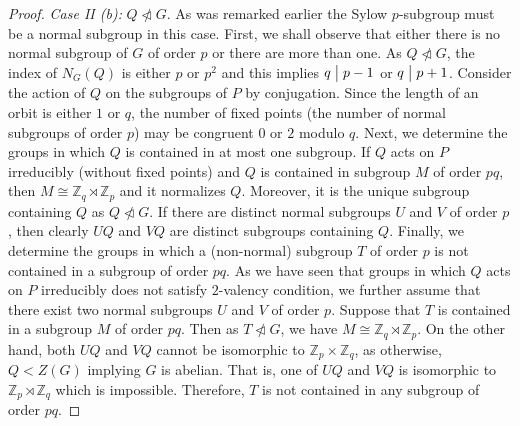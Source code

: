 \documentclass[a4paper,12pt]{article}
\theoremstyle{definition}
\theoremstyle{remark}
\theoremstyle{theorem}
\newcommand{\divides}{\bigm|}
\begin{document}
\begin{proof}
  \emph{Case II (b):} $Q\ntriangleleft G$. As was remarked earlier the Sylow $p$-subgroup must be a normal subgroup in this case. First, we shall observe
  that either there is no normal subgroup of $G$ of order $p$ or there
  are more than one. As $Q\ntriangleleft G$, the index of
  $N_G(Q)$ is either $p$ or $p^2$ and this implies
  $q\divides  p-1$ or $q\divides p+1$. Consider the action of $Q$ on the
  subgroups of $P$ by conjugation. Since the length of an orbit is
  either $1$ or $q$, the number of fixed points (the number of normal
  subgroups of order $p$) may be congruent $0$ or $2$ modulo $q$. Next,
  we determine the groups in which $Q$ is contained in at most one
  subgroup. If $Q$ acts on $P$ irreducibly (without fixed points) and
  $Q$ is contained in subgroup $M$ of order $pq$, then
  $M\cong\mathbb{Z}_q\rtimes\mathbb{Z}_p$ and it normalizes
  $Q$. Moreover, it is the unique subgroup containing $Q$ as
  $Q\ntriangleleft G$. If there are distinct normal subgroups $U$ and
  $V$ of order $p$, then clearly $UQ$ and $VQ$ are distinct
  subgroups containing $Q$. Finally, we determine the groups in which
  a (non-normal) subgroup $T$ of order $p$ is not contained in a
  subgroup of order $pq$. As we have seen that groups in which $Q$
  acts on $P$ irreducibly does not satisfy $2$-valency condition, we
  further assume that there exist two normal subgroups $U$ and $V$ of
  order $p$. Suppose that $T$ is contained in a subgroup $M$ of order
  $pq$. Then as $T\ntriangleleft G$, we have
  $M\cong\mathbb{Z}_q\rtimes\mathbb{Z}_p$. On the other hand, both
  $UQ$ and $VQ$ cannot be isomorphic to
  $\mathbb{Z}_p\times\mathbb{Z}_q$, as otherwise, $Q<Z(G)$
  implying $G$ is abelian. That is, one of $UQ$ and $VQ$ is isomorphic
  to $\mathbb{Z}_p\rtimes\mathbb{Z}_q$ which is impossible. Therefore,
  $T$ is not contained in any subgroup of order $pq$.





\end{proof}
\end{document}
